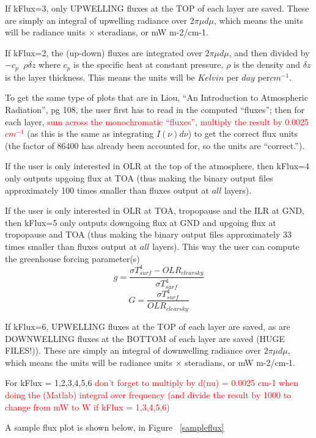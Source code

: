 \documentclass[12pt]{article}
\begin{document}
If kFlux=3, only UPWELLING fluxes at the TOP of each layer are saved. These
are simply an integral of upwelling radiance over $2 \pi \mu d\mu$, which means the units will 
be radiance units $\times$ steradians, or mW m-2/cm-1. 

If kFlux=2, the (up-down) fluxes are integrated over $2\pi \mu d\mu$, and 
then divided by $-c_{p} \;\; \rho \delta z$ where $c_{p}$ is the specific heat
at constant pressure, $\rho$ is the density and $\delta z$ is the layer 
thickness. This means the units will be $Kelvin$ per $day$ per$cm^{-1}$. 

To get the same type of plots that are in Liou, ``An Introduction to 
Atmospheric Radiation'', pg 108, the user first has to read in the computed 
``fluxes''; then for each layer, 
\textcolor{red}{sum across the monochromatic ``fluxes'', multiply the result 
by 0.0025 $cm^{-1}$} (as this is the same as integrating $I(\nu) d\nu$) to 
get the correct flux units (the factor of 86400 has already been accounted 
for, so the units are ``correct.''). 

If the user is only interested in OLR at the top of the atmosphere, 
then kFlux=4 only outputs upgoing flux at TOA (thus making the binary output 
files approximately 100 times smaller than fluxes output at $all$ layers).

If the user is only interested in OLR at TOA, tropopause and the ILR at GND, 
then kFlux=5 only outputs downgoing flux at GND and upgoing flux at 
tropopause and TOA (thus making the binary output files approximately 33 times
smaller than fluxes output at $all$ layers). This way the user can compute the
greenhouse forcing parameter(s) \cite{fre:96,sod:95}
\[
g = \frac{\sigma T_{surf}^4 - OLR_{clearsky}}{\sigma T_{surf}^4}
\]
\[
G = \frac{\sigma T_{surf}^4}{OLR_{clearsky}}
\]

If kFlux=6, UPWELLING fluxes at the TOP of each layer are saved, as are 
DOWNWELLING fluxes at the BOTTOM of each layer are saved (HUGE FILES!)). These
are simply an integral of downwelling radiance over $2 \pi \mu d\mu$, which means the units will 
be radiance units $\times$ steradians, or mW m-2/cm-1. 

For kFlux = 1,2,3,4,5,6
\textcolor{red}{don't forget to multiply by d(nu) = 0.0025 cm-1 
                when doing the (Matlab) integral over frequency (and divide 
                the result by 1000 to change from mW to W if kFlux = 1,3,4,5,6)}

A sample flux plot is shown below, in Figure ~\ref{sampleflux}
\end{document}
